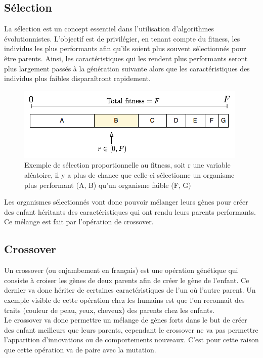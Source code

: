 \documentclass{article}
\begin{document}
\subsection{Sélection}

La sélection est un concept essentiel dans l'utilisation d'algorithmes évolutionnistes. L'objectif est de privilégier, en tenant compte du fitness, les individus les plus performants afin qu'ils soient plus souvent sélectionnés pour être parents. Ainsi, les caractéristiques qui les rendent plus performants seront plus largement passés à la génération suivante alors que les caractéristiques des individus plus faibles disparaîtront rapidement\cite{wikifps}.

\begin{figure}[H]
\begin{center}
	\includegraphics[scale=0.6]{fps.png} 
	\caption{Exemple de sélection proportionnelle au fitness, soit r une variable aléatoire, il y a plus de chance que celle-ci sélectionne un organisme plus performant (A, B) qu'un organisme faible (F, G)\cite{wikifps}}
\end{center}
\end{figure}

Les organismes sélectionnés vont donc pouvoir mélanger leurs gènes pour créer des enfant héritants des caractéristiques qui ont rendu leurs parents performants. Ce mélange est fait par l'opération de crossover.

\subsection{Crossover}

Un crossover (ou enjambement en français) est une opération génétique qui consiste à croiser les gènes de deux parents afin de créer le gène de l'enfant. Ce dernier va donc hériter de certaines caractéristiques de l'un où l'autre parent. Un exemple visible de cette opération chez les humains est que l'on reconnait des traits (couleur de peau, yeux, cheveux) des parents chez les enfants\cite{wikicrossover}.\\

Le crossover va donc permettre un mélange de gènes forts dans le but de créer des enfant meilleurs que leurs parents, cependant le crossover ne va pas permettre l'apparition d'innovations ou de comportements nouveaux. C'est pour cette raison que cette opération va de paire avec la mutation.
\end{document}
